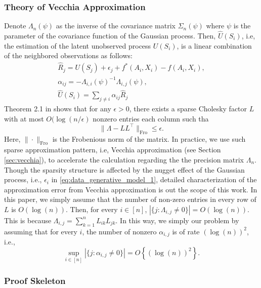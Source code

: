 \documentclass[12pt]{article}
\begin{document}
\subsubsection{Theory of Vecchia Approximation}\label{sec:theory_vecchia}
Denote $\Lambda_n(\psi)$ as the inverse of the covariance matrix $\Sigma_n(\psi)$ where $\psi$ is the parameter of the covariance function of the Gaussian process. Then, $\widehat U(S_i)$, i.e, the estimation of the latent unobserved process $U(S_i)$, is a linear combination of the neighbored observations as follows:
\begin{gather*}
\widehat{R}_{j} = U(S_j)+\epsilon_j+f^*(A_i,X_i) - f(A_i,X_i),\\
    \alpha_{ij} = -\Lambda_{i,i}(\psi)^{-1}\Lambda_{i,j}(\psi),\\
    \widehat U(S_i) =  \sum_{j\neq i}\alpha_{ij}\widehat{R}_{j}
\end{gather*}
Theorem 2.1 in \cite{schafer2021compression} shows that for any $\epsilon>0$, there exists a sparse Cholesky factor $L$ with  at most $O(\log(n/\epsilon)$ nonzero entries each column such tha
$$\|\Lambda - LL^\top\|_{\text{Fro}}\leq \epsilon.$$
Here, $\|\cdot\|_{\text{Fro}}$ is the Frobenious norm of the matrix. In practice, we use such sparse approximation pattern, i.e, Vecchia approximation (see Section \ref{sec:vecchia}), to accelerate the calculation regarding the the precision matrix $\Lambda_n$. Though the sparsity structure is affected by the nugget effect of the Gaussian process, i.e., $\epsilon_i$ in \eqref{eq:data_generative_model_1}, detailed characterization of the approximation error from Vecchia approximation is out the scope of this work. In this paper, we simply assume that the number of non-zero entries in every row of $L$ is $O(\log(n))$. Then, for every $i\in[n]$, $|\{j:\Lambda_{i,j}\neq 0\}| = O(\log(n))$. This is because $\Lambda_{i,j} = \sum_{k=1}^n L_{ik}L_{jk}$. In this way, we simply our problem by assuming that for every $i$, the number of nonzero $\alpha_{i,j}$ is of rate $(\log(n))^2$, i.e.,
\begin{equation}\label{eq:vecchina_approximation_nonzero}
    \sup_{i\in[n]}|\{j:\alpha_{i,j}\neq 0\}| = O\left\{(\log(n))^2\right\}.
\end{equation}

\subsubsection{Proof Skeleton}
 
\end{document}
